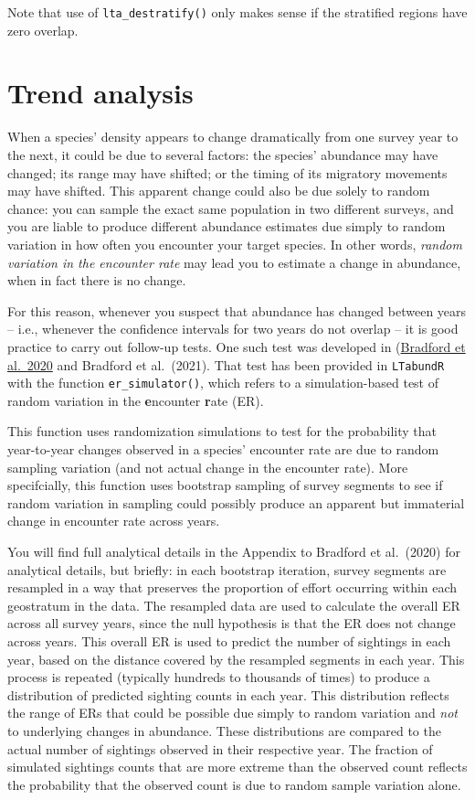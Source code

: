 \documentclass[
]{book}
\begin{document}
Note that use of \texttt{lta\_destratify()} only makes sense if the stratified regions have zero overlap.

\hypertarget{trend-analysis}{%
\chapter{Trend analysis}\label{trend-analysis}}

When a species' density appears to change dramatically from one survey year to the next, it could be due to several factors: the species' abundance may have changed; its range may have shifted; or the timing of its migratory movements may have shifted. This apparent change could also be due solely to random chance: you can sample the exact same population in two different surveys, and you are liable to produce different abundance estimates due simply to random variation in how often you encounter your target species. In other words, \emph{random variation in the encounter rate} may lead you to estimate a change in abundance, when in fact there is no change.

For this reason, whenever you suspect that abundance has changed between years -- i.e., whenever the confidence intervals for two years do not overlap -- it is good practice to carry out follow-up tests. One such test was developed in (\href{https://www.fisheries.noaa.gov/inport/item/59592}{Bradford et al.~2020} and Bradford et al.~(2021). That test has been provided in \texttt{LTabundR} with the function \texttt{er\_simulator()}, which refers to a simulation-based test of random variation in the \textbf{e}ncounter \textbf{r}ate (ER).

This function uses randomization simulations to test for the probability that year-to-year changes observed in a species' encounter rate are due to random sampling variation (and not actual change in the encounter rate). More specifcially, this function uses bootstrap sampling of survey segments to see if random variation in sampling could possibly produce an apparent but immaterial change in encounter rate across years.

You will find full analytical details in the Appendix to Bradford et al.~(2020) for analytical details, but briefly: in each bootstrap iteration, survey segments are resampled in a way that preserves the proportion of effort occurring within each geostratum in the data. The resampled data are used to calculate the overall ER across all survey years, since the null hypothesis is that the ER does not change across years. This overall ER is used to predict the number of sightings in each year, based on the distance covered by the resampled segments in each year. This process is repeated (typically hundreds to thousands of times) to produce a distribution of predicted sighting counts in each year. This distribution reflects the range of ERs that could be possible due simply to random variation and \emph{not} to underlying changes in abundance. These distributions are compared to the actual number of sightings observed in their respective year. The fraction of simulated sightings counts that are more extreme than the observed count reflects the probability that the observed count is due to random sample variation alone.
\end{document}
